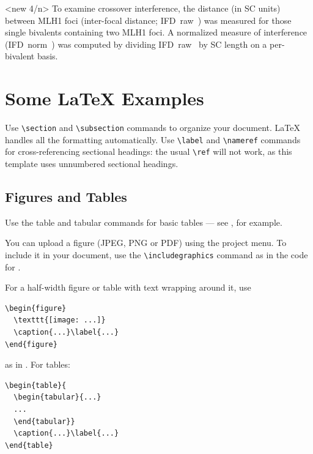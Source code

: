 \documentclass[9pt,lineno]{elife}
\begin{document}
<new 4/n>
To examine crossover interference, the distance (in SC units) between MLH1 foci (inter-focal distance; IFD~raw~) was measured for those single bivalents containing two MLH1 foci. A normalized measure of interference (IFD~norm~) was computed by dividing IFD~raw~ by SC length on a per-bivalent basis.

\section{Some \LaTeX{} Examples}
\label{sec:examples}

Use \verb|\section| and \verb|\subsection| commands to organize your document. \LaTeX{} handles all the formatting automatically. Use \verb|\label| and \verb|\nameref| commands for cross-referencing sectional headings: the usual \verb|\ref| will not work, as this template uses unnumbered sectional headings.

\subsection{Figures and Tables}

Use the table and tabular commands for basic tables --- see , for example. 

You can upload a figure (JPEG, PNG or PDF) using the project menu. To include it in your document, use the \verb|\includegraphics| command as in the code for . 

For a half-width figure or table with text wrapping around it, use 

\begin{verbatim}
\begin{figure}
  \texttt{[image: ...]}
  \caption{...}\label{...}
\end{figure}
\end{verbatim}
%
as in . For tables:

\begin{verbatim}
\begin{table}{
  \begin{tabular}{...}
  ...
  \end{tabular}}
  \caption{...}\label{...}
\end{table}
\end{verbatim}
\end{document}

